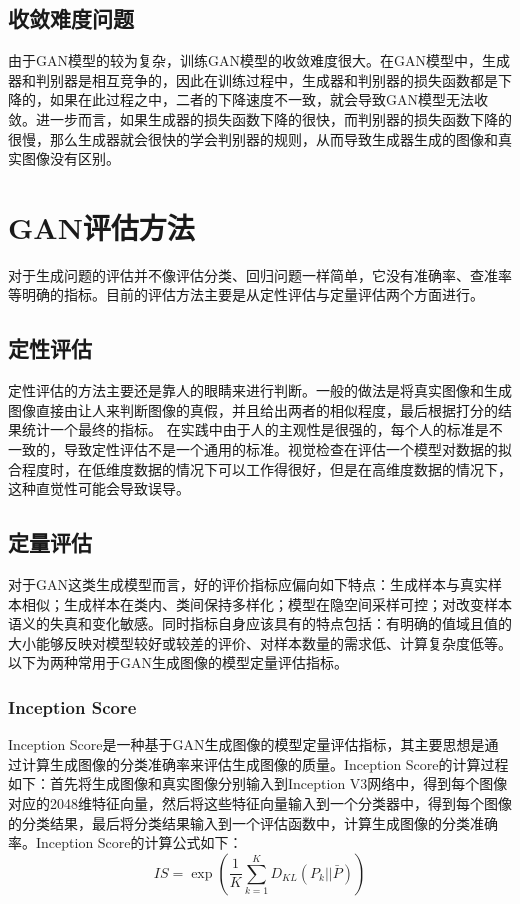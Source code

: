 \documentclass[lang=cn,a4paper,12pt,bibend=biber]{GAN}
\begin{document}
\subsection{收敛难度问题}

由于GAN模型的较为复杂，训练GAN模型的收敛难度很大。在GAN模型中，生成器和判别器是相互竞争的，因此在训练过程中，生成器和判别器的损失函数都是下降的，如果在此过程之中，二者的下降速度不一致，就会导致GAN模型无法收敛。进一步而言，如果生成器的损失函数下降的很快，而判别器的损失函数下降的很慢，那么生成器就会很快的学会判别器的规则，从而导致生成器生成的图像和真实图像没有区别。


\section{GAN评估方法}

对于生成问题的评估并不像评估分类、回归问题一样简单，它没有准确率、查准率等明确的指标。目前的评估方法主要是从定性评估与定量评估两个方面进行。

\subsection{定性评估}

定性评估的方法主要还是靠人的眼睛来进行判断。一般的做法是将真实图像和生成图像直接由让人来判断图像的真假，并且给出两者的相似程度，最后根据打分的结果统计一个最终的指标。
在实践中由于人的主观性是很强的，每个人的标准是不一致的，导致定性评估不是一个通用的标准。视觉检查在评估一个模型对数据的拟合程度时，在低维度数据的情况下可以工作得很好，但是在高维度数据的情况下，这种直觉性可能会导致误导。

\subsection{定量评估}

对于GAN这类生成模型而言，好的评价指标应偏向如下特点：生成样本与真实样本相似；生成样本在类内、类间保持多样化；模型在隐空间采样可控；对改变样本语义的失真和变化敏感。同时指标自身应该具有的特点包括：有明确的值域且值的大小能够反映对模型较好或较差的评价、对样本数量的需求低、计算复杂度低等。以下为两种常用于GAN生成图像的模型定量评估指标。


\subsubsection[]{Inception Score}

Inception Score是一种基于GAN生成图像的模型定量评估指标，其主要思想是通过计算生成图像的分类准确率来评估生成图像的质量。Inception Score的计算过程如下：首先将生成图像和真实图像分别输入到Inception V3网络中，得到每个图像对应的2048维特征向量，然后将这些特征向量输入到一个分类器中，得到每个图像的分类结果，最后将分类结果输入到一个评估函数中，计算生成图像的分类准确率。Inception Score的计算公式如下：
\begin{equation}
  IS = \exp\left(\frac{1}{K}\sum_{k=1}^{K} D_{KL}\left(P_{k}||\bar{P}\right)\right)
  \label{eq:inception_score}
\end{equation}
\end{document}
